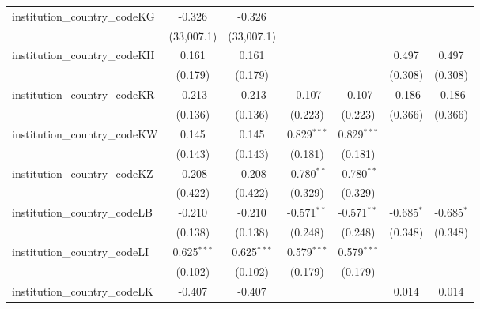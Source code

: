 \begin{tabular}{lcccccc}
   institution\_country\_codeKG          & -0.326         & -0.326         &                &                &                &   \\   
                                         & (33,007.1)     & (33,007.1)     &                &                &                &   \\   
   institution\_country\_codeKH          & 0.161          & 0.161          &                &                & 0.497          & 0.497\\   
                                         & (0.179)        & (0.179)        &                &                & (0.308)        & (0.308)\\   
   institution\_country\_codeKR          & -0.213         & -0.213         & -0.107         & -0.107         & -0.186         & -0.186\\   
                                         & (0.136)        & (0.136)        & (0.223)        & (0.223)        & (0.366)        & (0.366)\\   
   institution\_country\_codeKW          & 0.145          & 0.145          & 0.829$^{***}$  & 0.829$^{***}$  &                &   \\   
                                         & (0.143)        & (0.143)        & (0.181)        & (0.181)        &                &   \\   
   institution\_country\_codeKZ          & -0.208         & -0.208         & -0.780$^{**}$  & -0.780$^{**}$  &                &   \\   
                                         & (0.422)        & (0.422)        & (0.329)        & (0.329)        &                &   \\   
   institution\_country\_codeLB          & -0.210         & -0.210         & -0.571$^{**}$  & -0.571$^{**}$  & -0.685$^{*}$   & -0.685$^{*}$\\   
                                         & (0.138)        & (0.138)        & (0.248)        & (0.248)        & (0.348)        & (0.348)\\   
   institution\_country\_codeLI          & 0.625$^{***}$  & 0.625$^{***}$  & 0.579$^{***}$  & 0.579$^{***}$  &                &   \\   
                                         & (0.102)        & (0.102)        & (0.179)        & (0.179)        &                &   \\   
   institution\_country\_codeLK          & -0.407         & -0.407         &                &                & 0.014          & 0.014\\   

\end{tabular}
